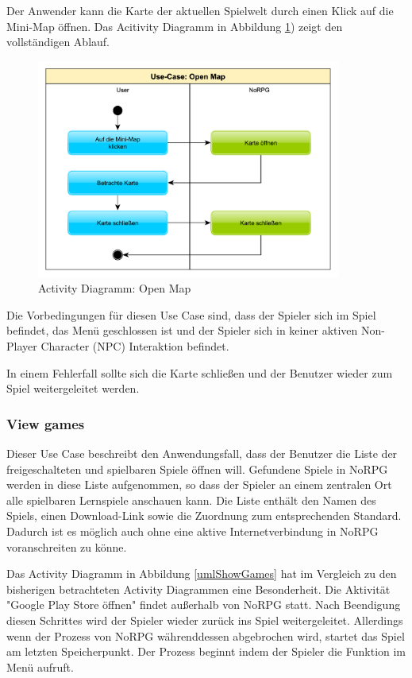 			Der Anwender kann die Karte der aktuellen Spielwelt durch einen Klick auf die Mini-Map öffnen. Das Acitivity Diagramm in Abbildung \ref{umlOpenMap}) zeigt den vollständigen Ablauf.
			
			\begin{figure}[htbp]
				\centering 
				\label{umlOpenMap}
				\includegraphics[width=10cm]{pics/OpenMap.pdf}
				\caption{Activity Diagramm: Open Map}
			\end{figure}
			
			Die Vorbedingungen für diesen Use Case sind, dass der Spieler sich im Spiel befindet, das Menü geschlossen ist und der Spieler sich in keiner aktiven Non-Player Character (NPC) Interaktion befindet.
			
			In einem Fehlerfall sollte sich die Karte schließen und der Benutzer wieder zum Spiel weitergeleitet werden.
	
		\subsubsection{View games}
			Dieser Use Case beschreibt den Anwendungsfall, dass der Benutzer die Liste der freigeschalteten und spielbaren Spiele öffnen will. Gefundene Spiele in NoRPG werden in diese Liste aufgenommen, so dass der Spieler an einem zentralen Ort alle spielbaren Lernspiele anschauen kann. Die Liste enthält den Namen des Spiels, einen Download-Link sowie die Zuordnung zum entsprechenden Standard. Dadurch ist es möglich auch ohne eine aktive Internetverbindung in NoRPG voranschreiten zu könne.
			
			Das Activity Diagramm in Abbildung \ref{umlShowGames} hat im Vergleich zu den bisherigen betrachteten Activity Diagrammen eine Besonderheit. Die Aktivität "Google Play Store öffnen" findet außerhalb von NoRPG statt. Nach Beendigung diesen Schrittes wird der Spieler wieder zurück ins Spiel weitergeleitet. Allerdings wenn der Prozess von NoRPG währenddessen abgebrochen wird, startet das Spiel am letzten Speicherpunkt. Der Prozess beginnt indem der Spieler die Funktion im Menü aufruft.
			
